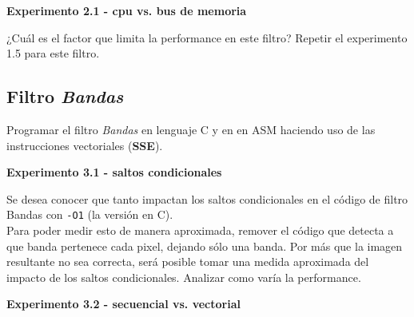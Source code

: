 \vspace*{0.3cm} \noindent
\textbf{Experimento 2.1 - cpu vs. bus de memoria}

¿Cuál es el factor que limita la performance en este filtro?
Repetir el experimento 1.5 para este filtro.

\subsection{Filtro \textit{Bandas}}

Programar el filtro \textit{Bandas} en lenguaje C y en en ASM haciendo uso de 
las instrucciones vectoriales (\textbf{SSE}).

\vspace*{0.3cm} \noindent
\textbf{Experimento 3.1 - saltos condicionales}

Se desea conocer que tanto impactan los saltos condicionales en el código 
de filtro Bandas con \verb|-O1| (la versión en C).\\
Para poder medir esto de manera aproximada, remover el código
que detecta a que banda pertenece cada pixel, dejando
sólo una banda.
Por más que la imagen resultante no sea correcta, será posible tomar una
medida aproximada del impacto de los saltos condicionales.
Analizar como varía la performance. 

\vspace*{0.3cm} \noindent
\textbf{Experimento 3.2 - secuencial vs. vectorial}

